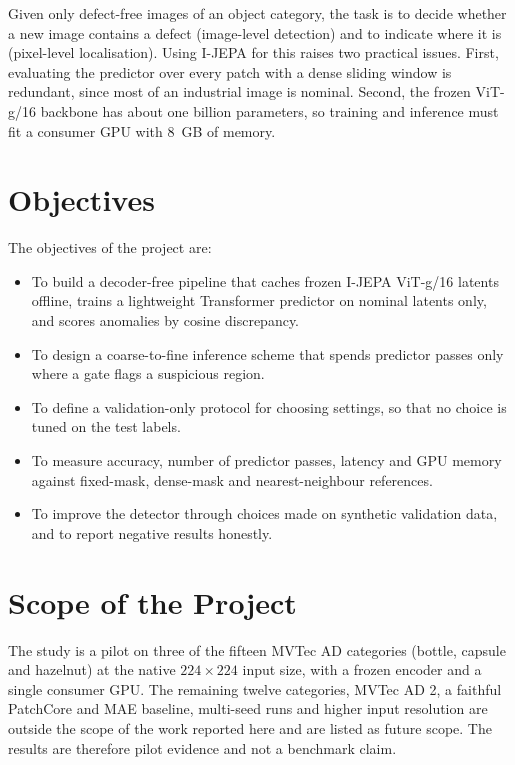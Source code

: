 \documentclass[12pt,a4paper,oneside]{report}
\begin{document}
Given only defect-free images of an object category, the task is to decide
whether a new image contains a defect (image-level detection) and to
indicate where it is (pixel-level localisation). Using I-JEPA for this
raises two practical issues. First, evaluating the predictor over every
patch with a dense sliding window is redundant, since most of an industrial
image is nominal. Second, the frozen ViT-g/16 backbone has about one billion
parameters, so training and inference must fit a consumer GPU with 8~GB of
memory.

\section{Objectives}

The objectives of the project are:
\begin{itemize}[leftmargin=*]
    \item To build a decoder-free pipeline that caches frozen I-JEPA
    ViT-g/16 latents offline, trains a lightweight Transformer predictor on
    nominal latents only, and scores anomalies by cosine discrepancy.
    \item To design a coarse-to-fine inference scheme that spends predictor
    passes only where a gate flags a suspicious region.
    \item To define a validation-only protocol for choosing settings, so
    that no choice is tuned on the test labels.
    \item To measure accuracy, number of predictor passes, latency and GPU
    memory against fixed-mask, dense-mask and nearest-neighbour references.
    \item To improve the detector through choices made on synthetic
    validation data, and to report negative results honestly.
\end{itemize}

\section{Scope of the Project}

The study is a pilot on three of the fifteen MVTec AD categories (bottle,
capsule and hazelnut) at the native $224\times224$ input size, with a frozen
encoder and a single consumer GPU. The remaining twelve categories, MVTec AD
2, a faithful PatchCore and MAE baseline, multi-seed runs and higher input
resolution are outside the scope of the work reported here and are listed as
future scope. The results are therefore pilot evidence and not a benchmark
claim.
\end{document}
